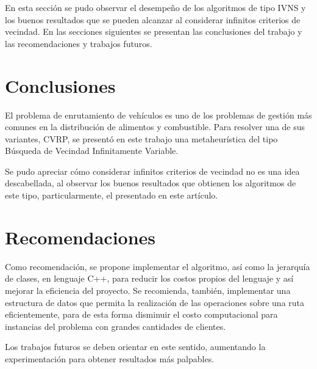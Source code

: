 \documentclass[a4paper,10pt,twocolumn]{article}
\begin{document}
	En esta sección se pudo observar el desempeño de los algoritmos de tipo IVNS y
	los buenos resultados que se pueden alcanzar al considerar infinitos criterios
	de vecindad. En las secciones siguientes se presentan las conclusiones del trabajo
	y las recomendaciones y trabajos futuros.
	

\section{Conclusiones}\label{sec:conc}

  El problema de enrutamiento de vehículos es uno de los problemas de gestión más
  comunes en la distribución de alimentos y combustible. Para resolver una de sus
  variantes, CVRP, se presentó en este trabajo una metaheurística del tipo Búsqueda 
  de Vecindad Infinitamente Variable.
  
  Se pudo apreciar cómo considerar infinitos criterios de vecindad no es una idea
  descabellada, al observar los buenos resultados que obtienen los algoritmos de este
  tipo, particularmente, el presentado en este artículo.




\section{Recomendaciones}\label{sec:rec}

  Como recomendación, se propone implementar el algoritmo, así como la jerarquía de
  clases, en lenguaje \textsc{C++}, para reducir los costos propios del lenguaje
  y así mejorar la eficiencia del proyecto. Se recomienda, también, implementar una
  estructura de datos que permita la realización de las operaciones sobre una ruta
  eficientemente, para de esta forma disminuir el costo computacional para instancias
  del problema con grandes cantidades de clientes.
  
  Los trabajos futuros se deben orientar en este sentido, aumentando la experimentación
  para obtener resultados más palpables.
  
\end{document}
